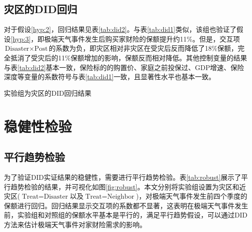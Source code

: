 \subsection{灾区的DID回归}
对于假设\ref{hyp:2}，回归结果见表\ref{tab:did2}。与表\ref{tab:did1}类似，该组也验证了假设\ref{hyp:3}，即极端天气事件发生后购买家财险的保额提升约11\%。但是，交互项$\text{Disaster}\times \text{Post}$的系数为负，即灾区相对非灾区在受灾后反而降低了18\%保额，完全抵消了受灾后的11\%保额增加的影响，保额反而相对降低。其他控制变量的结果与表\ref{tab:did2}基本一致，保险标的的购置价、家庭之前投保过、GDP增速、保险深度等变量的系数符号与表\ref{tab:did1}一致，且显著性水平也基本一致。

\begin{table}[H]
    \centering
    \caption{实验组为灾区的DID回归结果}\label{tab:did2}
    
\end{table}

\section{稳健性检验}
\subsection{平行趋势检验}

为了验证DID实证结果的稳健性，需要进行平行趋势检验。表\ref{tab:robust}展示了平行趋势检验的结果，并可视化如图\ref{fig:robust}。本文分别将实验组设置为灾区和近灾区($\text{Treat}=\text{Disaster}$以及$\text{Treat}=\text{Neighbor}$)，对极端天气事件发生前四个季度的保额进行回归。回归结果显示交互项的系数都不显著，这表明在极端天气事件发生前，实验组和对照组的保额水平基本是平行的，满足平行趋势假设，可以通过DID方法来估计极端天气事件对家财险需求的影响。

